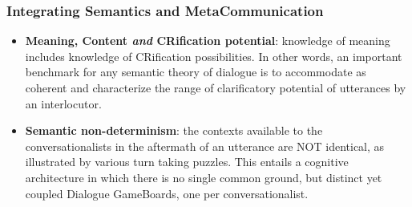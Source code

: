 \documentclass{beamer}
\newcommand{\ignore}[1]{}
\begin{document}
\ignore{
\begin{frame}
\frametitle{Integrating Semantics and MetaCommunication }

\begin{itemize}


\item Just seen data that calls into question
certain fundamental assumptions of a large body of semantic theory, in
linguistics, the philosophy of language, and computational work, a
view we have dubbed {\sf Communitarian Semantics}.

\item What are the positive
conclusions we can draw on the basis of this data, the nucleus of the
{\sf interactive stance}?

\end{itemize}

\end{frame}
}

\begin{frame}
\frametitle{Integrating Semantics and MetaCommunication }

\begin{itemize}

 \item {\bf  Meaning, Content {\it and} CRification potential}: 
knowledge of meaning includes knowledge of CRification possibilities.
In other words, an important benchmark for any
  semantic theory of dialogue is to accommodate as coherent and
 characterize the range of clarificatory   potential of utterances by
 an interlocutor.


\item {\bf Semantic non-determinism}: the contexts available to
  the conversationalists in the aftermath of an utterance are NOT
  identical, as illustrated by various turn taking puzzles. This
  entails a cognitive architecture in which there is no single common
  ground, but distinct yet coupled Dialogue GameBoards, one per conversationalist.

\end{itemize}

\end{frame}
\end{document}
